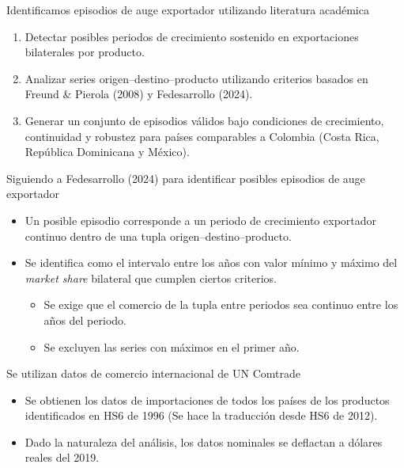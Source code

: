 \documentclass[aspectratio=169,xcolor=dvipsnames]{beamer}
\begin{document}
\begin{frame}{Identificamos episodios de auge exportador utilizando literatura académica}
    \begin{enumerate}
        \item Detectar posibles periodos de crecimiento sostenido en exportaciones bilaterales por producto.
        \item Analizar series origen–destino–producto utilizando criterios basados en Freund \& Pierola (2008) y Fedesarrollo (2024).
        \item Generar un conjunto de episodios válidos bajo condiciones de crecimiento, continuidad y robustez para países comparables a Colombia (Costa Rica, República Dominicana y México).
    \end{enumerate}
\end{frame}

\begin{frame}{Siguiendo a Fedesarrollo (2024) para identificar posibles episodios de auge exportador}
    \begin{itemize}
        \item Un posible episodio corresponde a un periodo de crecimiento exportador continuo dentro de una tupla origen–destino–producto.
        \item Se identifica como el intervalo entre los años con valor mínimo y máximo del \textit{market share} bilateral que cumplen ciertos criterios.
        \begin{itemize}
            \item Se exige que el comercio de la tupla entre periodos sea continuo entre los años del periodo.
            \item Se excluyen las series con máximos en el primer año.
        \end{itemize}
    \end{itemize}
\end{frame}

\begin{frame}{Se utilizan datos de comercio internacional de UN Comtrade}
    \begin{itemize}
        \item Se obtienen los datos de importaciones de todos los países de los productos identificados en HS6 de 1996 (Se hace la traducción desde HS6 de 2012).
        \item Dado la naturaleza del análisis, los datos nominales se deflactan a dólares reales del 2019.
    \end{itemize}
\end{frame}
\end{document}
